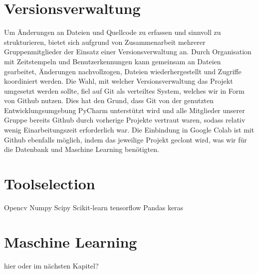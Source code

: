 \section{Versionsverwaltung}
Um Änderungen an Dateien und Quellcode zu erfassen und sinnvoll zu strukturieren, bietet sich aufgrund von Zusammenarbeit mehrerer Gruppenmitglieder der Einsatz einer Versionsverwaltung an. Durch Organisation mit Zeitstempeln und Benutzerkennungen kann gemeinsam an Dateien gearbeitet, Änderungen nachvollzogen, Dateien wiederhergestellt und Zugriffe koordiniert werden. Die Wahl, mit welcher Versionsverwaltung das Projekt umgesetzt werden sollte, fiel auf Git als verteiltes System, welches wir in Form von Github nutzen. Dies hat den Grund, dass Git von der genutzten Entwicklungsumgebung PyCharm unterstützt wird und alle Mitglieder unserer Gruppe bereits Github durch vorherige Projekte vertraut waren, sodass relativ wenig Einarbeitungszeit erforderlich war. Die Einbindung in Google Colab ist mit Github ebenfalls möglich, indem das jeweilige Projekt geclont wird, was wir für die Datenbank und Maschine Learning benötigten.
\section{Toolselection}
	Opencv
	Numpy
	Scipy
	Scikit-learn
	tensorflow
	Pandas
	keras
	
	
\section{Maschine Learning}
hier oder im nächsten Kapitel?
